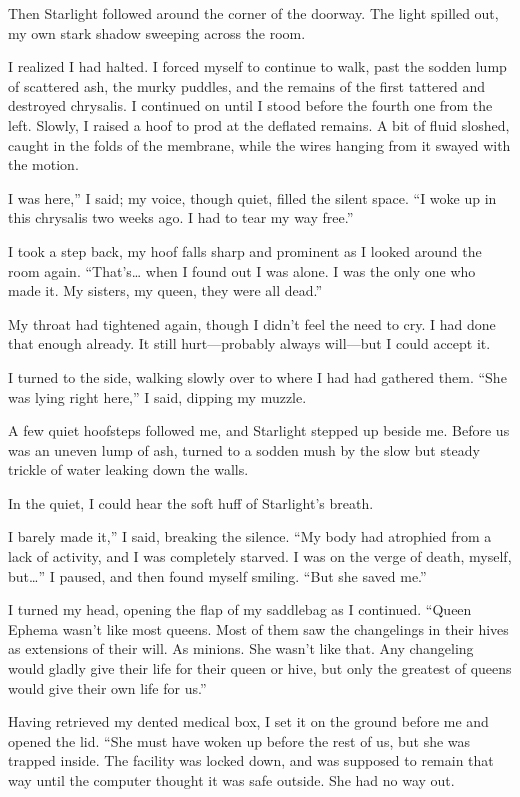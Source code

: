 Then Starlight followed around the corner of the doorway. The light spilled out, my own stark shadow sweeping across the room.

I realized I had halted. I forced myself to continue to walk, past the sodden lump of scattered ash, the murky puddles, and the remains of the first tattered and destroyed chrysalis. I continued on until I stood before the fourth one from the left. Slowly, I raised a hoof to prod at the deflated remains. A bit of fluid sloshed, caught in the folds of the membrane, while the wires hanging from it swayed with the motion.

\leavevmode{}I was here,” I said; my voice, though quiet, filled the silent space. “I woke up in this chrysalis two weeks ago. I had to tear my way free.”

I took a step back, my hoof falls sharp and prominent as I looked around the room again. “That’s… when I found out I was alone. I was the only one who made it. My sisters, my queen, they were all dead.”

My throat had tightened again, though I didn’t feel the need to cry. I had done that enough already. It still hurt—probably always will—but I could accept it.

I turned to the side, walking slowly over to where I had had gathered them. “She was lying right here,” I said, dipping my muzzle.

A few quiet hoofsteps followed me, and Starlight stepped up beside me. Before us was an uneven lump of ash, turned to a sodden mush by the slow but steady trickle of water leaking down the walls.

In the quiet, I could hear the soft huff of Starlight’s breath.

\leavevmode{}I barely made it,” I said, breaking the silence. “My body had atrophied from a lack of activity, and I was completely starved. I was on the verge of death, myself, but…” I paused, and then found myself smiling. “But she saved me.”

I turned my head, opening the flap of my saddlebag as I continued. “Queen Ephema wasn’t like most queens. Most of them saw the changelings in their hives as extensions of their will. As minions. She wasn’t like that. Any changeling would gladly give their life for their queen or hive, but only the greatest of queens would give their own life for us.”

Having retrieved my dented medical box, I set it on the ground before me and opened the lid. “She must have woken up before the rest of us, but she was trapped inside. The facility was locked down, and was supposed to remain that way until the computer thought it was safe outside. She had no way out.

